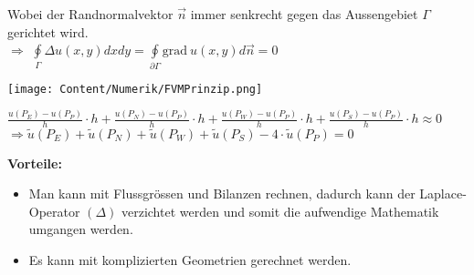 Wobei der Randnormalvektor $\vec{n}$ immer senkrecht gegen das Aussengebiet $\Gamma$ gerichtet wird.\\

$\Rightarrow$ $\oint\limits_{\Gamma}{\Delta u(x,y) dx dy}=\oint\limits_{\partial\Gamma}{\mathrm{grad}~ u(x,y) d\vec{n}}=0$

\begin{minipage}{4cm}
  \texttt{[image: Content/Numerik/FVMPrinzip.png]}
\end{minipage}
\hfill
\begin{minipage}{14cm}
  $\frac{u(P_E)-u(P_P)}{h}\cdot h+\frac{u(P_N)-u(P_P)}{h}\cdot h+\frac{u(P_W)-u(P_P)}{h}\cdot h+\frac{u(P_S)-u(P_P)}{h}\cdot h\approx 0$\\

  $\Rightarrow\tilde{u}(P_E)+\tilde{u}(P_N)+\tilde{u}(P_W)+\tilde{u}(P_S)-4\cdot\tilde{u}(P_P)=0$
\end{minipage}

\textbf{Vorteile:}\\
\begin{itemize}
  \item Man kann mit Flussgrössen und Bilanzen rechnen, dadurch kann der
        Laplace-Operator $(\Delta)$ verzichtet werden und somit die aufwendige Mathematik umgangen werden.
  \item Es kann mit komplizierten Geometrien gerechnet werden.
\end{itemize}


